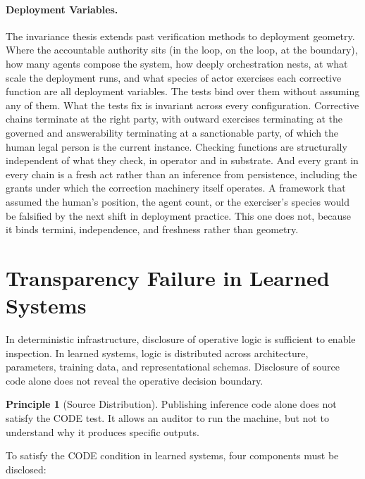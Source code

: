\documentclass{article}
\theoremstyle{definition}
\newtheorem{principle}{Principle}[section]
\begin{document}
\paragraph{Deployment Variables.} The invariance thesis extends past verification methods to deployment geometry. Where the accountable authority sits (in the loop, on the loop, at the boundary), how many agents compose the system, how deeply orchestration nests, at what scale the deployment runs, and what species of actor exercises each corrective function are all deployment variables. The tests bind over them without assuming any of them. What the tests fix is invariant across every configuration. Corrective chains terminate at the right party, with outward exercises terminating at the governed and answerability terminating at a sanctionable party, of which the human legal person is the current instance. Checking functions are structurally independent of what they check, in operator and in substrate. And every grant in every chain is a fresh act rather than an inference from persistence, including the grants under which the correction machinery itself operates. A framework that assumed the human's position, the agent count, or the exerciser's species would be falsified by the next shift in deployment practice. This one does not, because it binds termini, independence, and freshness rather than geometry.


\section{Transparency Failure in Learned Systems}
\label{sec:code-ai}

In deterministic infrastructure, disclosure of operative logic is sufficient to enable inspection. In learned systems, logic is distributed across architecture, parameters, training data, and representational schemas. Disclosure of source code alone does not reveal the operative decision boundary.

\begin{principle}[Source Distribution]
Publishing inference code alone does not satisfy the CODE test. It allows an auditor to run the machine, but not to understand why it produces specific outputs.
\end{principle}

To satisfy the CODE condition in learned systems, four components must be disclosed:
\end{document}
